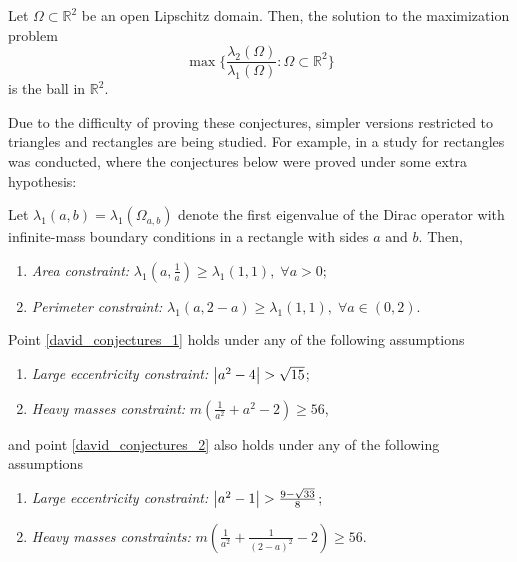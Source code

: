 \begin{conjecture}\label{conjecture_benguria}
    Let \(\Omega \subset \mathbb{R}^2\) be an open Lipschitz domain. Then, the solution to the maximization problem 
    \[
    \max \Big\{\frac{\lambda_2(\Omega)}{\lambda_1(\Omega)}: \Omega \subset \mathbb{R}^2\Big\}
    \]
    is the ball in \(\mathbb{R}^2\).
\end{conjecture}


Due to the difficulty of proving these conjectures, simpler versions restricted to triangles and rectangles are being studied. For example, in \cite{briet2022spectral} a study for rectangles was conducted, where the conjectures below were proved under some extra hypothesis:

\begin{conjecture}\label{david_conjectures}
    Let \(\lambda_1(a, b) = \lambda_1(\Omega_{a, b})\) denote the first eigenvalue of the Dirac operator with infinite-mass boundary conditions in a rectangle with sides \(a\) and \(b\). Then,
    \begin{enumerate}
        \item \label{david_conjectures_1} \textit{Area constraint: } \(\lambda_1(a, \frac{1}{a}) \geq \lambda_1(1, 1), \; \forall a>0 \);
        \item  \label{david_conjectures_2} \textit{Perimeter constraint: } \(\lambda_1(a, 2-a) \geq \lambda_1(1, 1), \; \forall a\in (0, 2)\).
    \end{enumerate}
    Point \ref{david_conjectures_1} holds under any of the following assumptions
    \begin{enumerate}
        \item \textit{Large eccentricity constraint: } \(\abs{a^2-4} > \sqrt{15}\);
        \item \textit{Heavy masses constraint: } \(m \left(\frac{1}{a^2}+a^2-2\right) \geq 56\),
    \end{enumerate}
    and point \ref{david_conjectures_2} also holds under any of the following assumptions
    \begin{enumerate}
        \item \textit{Large eccentricity constraint: } \(\abs{a^2-1} > \frac{9-\sqrt{33}}{8}\);
        \item \textit{Heavy masses constraints: } \(m \left(\frac{1}{a^2}+\frac{1}{(2-a)^2}-2\right) \geq 56\).
    \end{enumerate}
\end{conjecture}


